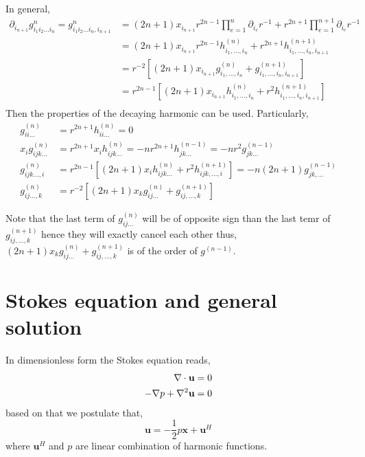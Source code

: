 \documentclass[12pt]{My_preprint}
\begin{document}
In general,
\begin{align*}
    \partial_{i_{n+1}} g^{n}_{i_1i_2\ldots i_n}
    =  g^{n}_{i_1i_2\ldots i_n,i_{n+1}}
    &=
    (2n+1)x_{i_{n+1}} r^{2n-1}
    \prod_{e=1}^{n}
    \partial_{i_e}
    r^{-1}
    + 
    r^{2n+1}
    \prod_{e=1}^{n+1}
    \partial_{i_e}
    r^{-1} \\
    &=
    (2n+1)x_{i_{n+1}} r^{2n-1}
    h_{i_1,\ldots,i_{n}}^{(n)}
    + 
    r^{2n+1}
    h_{i_1,\ldots,i_{n},i_{n+1}}^{(n+1)} \\
    &=
    r^{-2}[(2n+1) 
    x_{i_{n+1}} 
    g_{i_1,\ldots,i_{n}}^{(n)}
    + 
    g_{i_1,\ldots,i_{n},i_{n+1}}^{(n+1)}] \\
    &=
    r^{2n-1}[
    (2n+1)x_{i_{n+1}} 
    h_{i_1,\ldots,i_{n}}^{(n)}
    + 
    r^{2}
    h_{i_1,\ldots,i_{n},i_{n+1}}^{(n+1)} ]\\
\end{align*}
Then the properties of the decaying harmonic can be used.
Particularly,
\begin{align*}
    g_{ii\ldots}^{(n)} &= 
        r^{2n+1}
        h_{ii\ldots}^{(n)}
        = 0
    \\
    x_i g_{ijk\ldots }^{(n)} &= 
    r^{2n+1}
    x_i h_{ijk\ldots}^{(n)}
    = - n r^{2n+1} h_{jk\ldots }^{(n-1)}  
    = - n r^2 g_{jk\ldots }^{(n-1)}  \\
    g_{ijk\ldots,i}^{(n)} &= 
    r^{2n-1}[
    (2n+1)x_{i} 
    h_{ijk\ldots}^{(n)}
    + 
    r^{2}
    h_{ijk,\ldots,i}^{(n+1)} ]
    = - n (2n+1)  g_{jk,\ldots}^{(n- 1)} \\
    g_{ij\ldots,k}^{(n)}
    &= r^{-2}[
        (2n+1) 
    x_{k} 
    g_{ij\ldots}^{(n)}
    + 
    g_{ij,\ldots,k}^{(n+1)}] 
\end{align*}

Note that the last term of $g_{ij\ldots}^{(n)}$ will be of opposite sign than the last temr of $g_{ij,\ldots,k}^{(n+1)}$ hence they will exactly cancel each other thus, $(2n+1) x_{k} g_{ij\ldots}^{(n)}+ g_{ij,\ldots,k}^{(n+1)}$ is of the order of $g^{(n-1)}$. 


\section{Stokes equation and general solution}

In dimensionless form the Stokes equation reads, 
\begin{align}
    \mathbf{\nabla}\cdot \textbf{u}&= 0\\
    -\mathbf{\nabla} p + \mathbf{\nabla}^2 \textbf{u} &= 0 
\end{align}
based on that we postulate that,
\begin{equation}
    \textbf{u} =
    -\frac{1}{2} p \textbf{x} 
    + \textbf{u}^H
\end{equation}
where $\textbf{u}^H$ and $p$ are linear combination of harmonic functions. 
\end{document}

